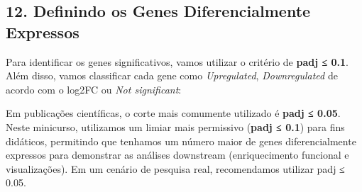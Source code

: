 \documentclass[
  letterpaper,
  DIV=11,
  numbers=noendperiod]{scrreprt}
\newenvironment{Shaded}{\begin{snugshade}}{\end{snugshade}}
\newcommand{\AttributeTok}[1]{\textcolor[rgb]{0.40,0.45,0.13}{#1}}
\newcommand{\CommentTok}[1]{\textcolor[rgb]{0.37,0.37,0.37}{#1}}
\newcommand{\DecValTok}[1]{\textcolor[rgb]{0.68,0.00,0.00}{#1}}
\newcommand{\FloatTok}[1]{\textcolor[rgb]{0.68,0.00,0.00}{#1}}
\newcommand{\FunctionTok}[1]{\textcolor[rgb]{0.28,0.35,0.67}{#1}}
\newcommand{\NormalTok}[1]{\textcolor[rgb]{0.00,0.23,0.31}{#1}}
\newcommand{\OtherTok}[1]{\textcolor[rgb]{0.00,0.23,0.31}{#1}}
\newcommand{\SpecialCharTok}[1]{\textcolor[rgb]{0.37,0.37,0.37}{#1}}
\newcommand{\StringTok}[1]{\textcolor[rgb]{0.13,0.47,0.30}{#1}}
\begin{document}
\subsection{12. Definindo os Genes Diferencialmente
Expressos}\label{definindo-os-genes-diferencialmente-expressos}

Para identificar os genes significativos, vamos utilizar o critério de
\textbf{padj ≤ 0.1}. Além disso, vamos classificar cada gene como
\emph{Upregulated}, \emph{Downregulated} de acordo com o log2FC ou
\emph{Not significant}:

\begin{tcolorbox}[enhanced jigsaw, arc=.35mm, colframe=quarto-callout-warning-color-frame, breakable, bottomrule=.15mm, colback=white, left=2mm, titlerule=0mm, opacityback=0, title=\textcolor{quarto-callout-warning-color}{\faExclamationTriangle}\hspace{0.5em}{Nota Didática}, leftrule=.75mm, colbacktitle=quarto-callout-warning-color!10!white, bottomtitle=1mm, toprule=.15mm, toptitle=1mm, rightrule=.15mm, opacitybacktitle=0.6, coltitle=black]

Em publicações científicas, o corte mais comumente utilizado é
\textbf{padj ≤ 0.05}. Neste minicurso, utilizamos um limiar mais
permissivo (\textbf{padj ≤ 0.1}) para fins didáticos, permitindo que
tenhamos um número maior de genes diferencialmente expressos para
demonstrar as análises downstream (enriquecimento funcional e
visualizações). Em um cenário de pesquisa real, recomendamos utilizar
padj ≤ 0.05.

\end{tcolorbox}

\begin{Shaded}
\end{Shaded}
\end{document}
